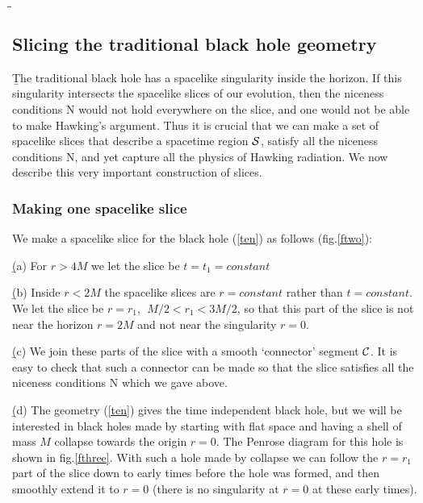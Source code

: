 \documentclass[12pt]{article}
\begin{document}
\b

\b

\subsection{Slicing the traditional  black hole geometry}

\b


The traditional black hole has a spacelike singularity inside the horizon. If this singularity intersects the spacelike slices of our evolution, then the niceness conditions N would not hold everywhere on the slice, and one would not be able to make  Hawking's argument. Thus it is crucial that we can make a set of spacelike slices that describe a spacetime region ${\cal S}$, satisfy all the niceness conditions N, and yet capture all the physics of Hawking radiation. We now describe this very important construction of slices.

\subsubsection{Making one spacelike slice}

We make a spacelike slice for the black hole (\ref{ten}) as follows (fig.\ref{ftwo}):

\b

(a) For $r>4M$ we let the slice be $
t=t_1=constant
$

\b


(b) Inside $r<2M$ the spacelike slices are $r=constant$ rather than $t=constant$. We let the slice be
$
r=r_1, ~~{M/ 2}<r_1<{3M/ 2}
$,
so that this part of the slice is not near the horizon  $r=2M$ and not near the singularity  $r=0$.

\b


(c) We join these parts of the slice with a smooth `connector' segment ${\cal C}$. It is easy to check that such a connector can be made so that the slice satisfies all the niceness conditions N which we gave above.

\b


(d) The geometry (\ref{ten}) gives the time independent black hole, but we will be interested in black holes made by starting with flat space and having a shell of mass $M$ collapse towards the origin $r=0$. The Penrose diagram for this hole is shown in fig.\ref{fthree}. With such a hole made by collapse we can follow the $r=r_1$ part of the slice down to early times before the hole was formed, and then smoothly extend it to $r=0$ (there is no singularity at $r=0$ at these early times). 
\end{document}
